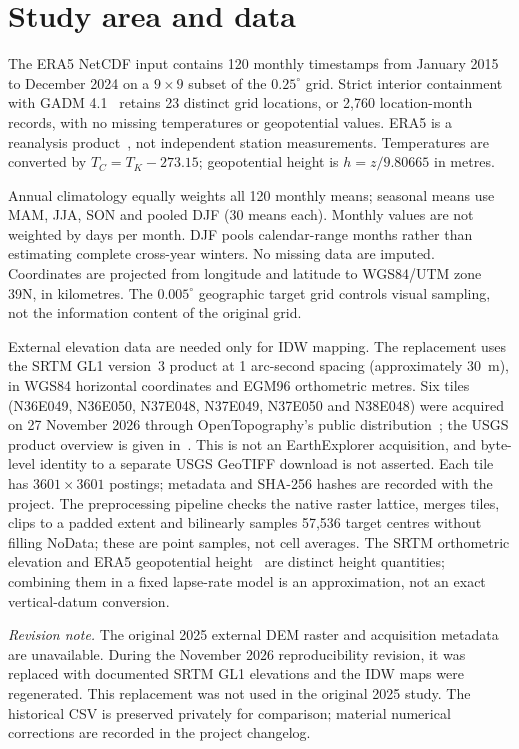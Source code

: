\documentclass[11pt,a4paper]{article}
\begin{document}
\section{Study area and data}
The ERA5 NetCDF input contains 120 monthly timestamps from January 2015 to December 2024 on a $9\times9$ subset of the $0.25^\circ$ grid. Strict interior containment with GADM 4.1~\cite{gadm} retains 23 distinct grid locations, or 2,760 location-month records, with no missing temperatures or geopotential values. ERA5 is a reanalysis product~\cite{era5}, not independent station measurements. Temperatures are converted by $T_C=T_K-273.15$; geopotential height is $h=z/9.80665$ in metres.

Annual climatology equally weights all 120 monthly means; seasonal means use MAM, JJA, SON and pooled DJF (30 means each). Monthly values are not weighted by days per month. DJF pools calendar-range months rather than estimating complete cross-year winters. No missing data are imputed. Coordinates are projected from longitude and latitude to WGS84/UTM zone 39N, in kilometres. The $0.005^\circ$ geographic target grid controls visual sampling, not the information content of the original grid.

External elevation data are needed only for IDW mapping. The replacement uses the SRTM GL1 version~3 product at 1 arc-second spacing (approximately 30~m), in WGS84 horizontal coordinates and EGM96 orthometric metres. Six tiles (N36E049, N36E050, N37E048, N37E049, N37E050 and N38E048) were acquired on 27 November 2026 through OpenTopography's public distribution~\cite{opentopo}; the USGS product overview is given in~\cite{srtm}. This is not an EarthExplorer acquisition, and byte-level identity to a separate USGS GeoTIFF download is not asserted. Each tile has $3601\times3601$ postings; metadata and SHA-256 hashes are recorded with the project. The preprocessing pipeline checks the native raster lattice, merges tiles, clips to a padded extent and bilinearly samples 57,536 target centres without filling NoData; these are point samples, not cell averages. The SRTM orthometric elevation and ERA5 geopotential height~\cite{ecmwf} are distinct height quantities; combining them in a fixed lapse-rate model is an approximation, not an exact vertical-datum conversion.

\textit{Revision note.} The original 2025 external DEM raster and acquisition metadata are unavailable. During the November 2026 reproducibility revision, it was replaced with documented SRTM GL1 elevations and the IDW maps were regenerated. This replacement was not used in the original 2025 study. The historical CSV is preserved privately for comparison; material numerical corrections are recorded in the project changelog.
\end{document}
